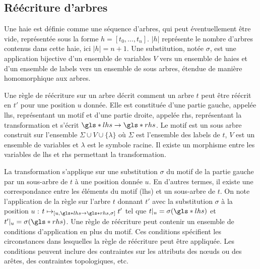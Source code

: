 \subsection{Réécriture d'arbres}

\begin{definition}[Haie]
    Une haie est définie comme une séquence d'arbres, qui peut éventuellement être vide, représentée sous la forme $h = [t_0, \dots , t_n]$.
    $|h|$ représente le nombre d'arbres contenus dans cette haie, ici $|h| = n + 1$.
    Une substitution, notée $\sigma$, est une application bijective d'un ensemble de variables $V$ vers un ensemble de haies et d'un ensemble de labels vers un ensemble de sous arbres, étendue de manière homomorphique aux arbres.
\end{definition}

\begin{definition}
    Une règle de réécriture sur un arbre décrit comment un arbre $t$ peut être réécrit en $t'$ pour une position $u$ donnée.
    Elle est constituée d'une partie gauche, appelée \gls{lhs}, représentant un motif et d'une partie droite, appelée \gls{rhs}, représentant la transformation et s'écrit $\gls*{lhs} \to \gls*{rhs}$.
    Le motif est un sous arbre construit sur l'ensemble $\Sigma \cup V \cup \{\lambda\}$ où $\Sigma$ est l'ensemble des labels de $t$, $V$ est un ensemble de variables et $\lambda$ est le symbole racine.
    Il existe un morphisme entre les variables de \gls{lhs} et \gls{rhs} permettant la transformation.

    La transformation s'applique sur une substitution $\sigma$ du motif de la partie gauche par un sous-arbre de $t$ à une position donnée $u$.
    En d'autres termes, il existe une correspondance entre les éléments du motif (\gls{lhs}) et un sous-arbre de $t$.
    On note l'application de la règle sur l'arbre $t$ donnant $t'$ avec la substitution $\sigma$ à la position $u$ : $t \mapsto_{[u, \gls*{lhs} \to \gls*{rhs}, \sigma]} t'$ tel que $t|_u = \sigma(\gls*{lhs})$ et $t'|_u = \sigma(\gls*{rhs})$.
    Une règle de réécriture peut contenir un ensemble de conditions d'application en plus du motif.
    Ces conditions spécifient les circonstances dans lesquelles la règle de réécriture peut être appliquée.
    Les conditions peuvent inclure des contraintes sur les attributs des nœuds ou des arêtes, des contraintes topologiques, etc.
\end{definition}


